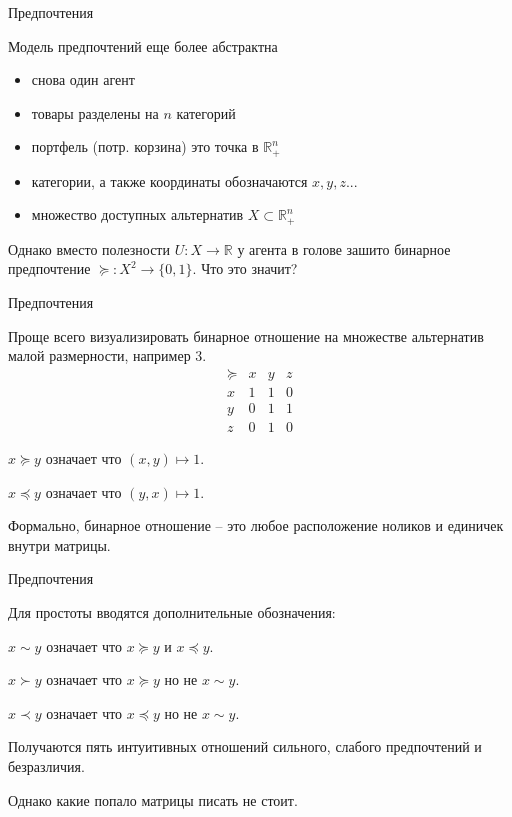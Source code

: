 \documentclass{beamer}
\begin{document}
\begin{frame}{Предпочтения}

Модель предпочтений еще более абстрактна

\begin{itemize}
\item снова один агент
\item товары разделены на $n$ категорий
\item портфель (потр. корзина) это точка в $\mathbb{R}_{+}^{n}$	
\item категории, а также координаты обозначаются $x, y, z...$
\item множество доступных альтернатив $X \subset \mathbb{R}_{+}^{n}$
\end{itemize}

Однако вместо полезности $U: X \to \mathbb{R}$ у агента в голове зашито бинарное предпочтение $\succcurlyeq: X^2 \to \{0,1\}.$ Что это значит?

\end{frame}

\begin{frame}{Предпочтения}

Проще всего визуализировать бинарное отношение на множестве альтернатив малой размерности, например 3.
$$
\begin{array}{c|ccc}
 \succcurlyeq & x & y & z\\
\hline
x & 1 & 1 & 0 \\
y & 0 & 1 & 1\\
z & 0 & 1 & 0
\end{array}
$$

$x \succcurlyeq y$ означает что $(x,y) \mapsto 1$.

$x \preccurlyeq y$ означает что $(y,x) \mapsto 1$.

Формально, бинарное отношение – это любое расположение ноликов и единичек внутри матрицы.

\end{frame}

\begin{frame}{Предпочтения}

Для простоты вводятся дополнительные обозначения:

$x \sim y$ означает что $x \succcurlyeq y$ и $x \preccurlyeq y$.

$x \succ y$ означает что $x \succcurlyeq y$ но не $x \sim y$.

$x \prec y$ означает что $x \preccurlyeq y$ но не $x \sim y$.

Получаются пять интуитивных отношений сильного, слабого предпочтений и безразличия.

Однако какие попало матрицы писать не стоит.

\end{frame}
\end{document}
